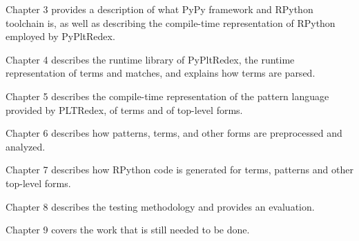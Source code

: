 Chapter 3 provides a description of what PyPy framework and RPython toolchain is, as well as describing the compile-time representation of RPython employed by PyPltRedex.

Chapter 4 describes the runtime library of PyPltRedex, the runtime representation of terms and matches, and explains how terms are parsed.

Chapter 5 describes the compile-time representation of the pattern language provided by PLTRedex, of terms and of top-level forms.

Chapter 6 describes how patterns, terms, and other forms are preprocessed and analyzed.

Chapter 7 describes how RPython code is generated for terms, patterns and other top-level forms.

Chapter 8 describes the testing methodology and provides an evaluation. 

Chapter 9 covers the work that is still needed to be done.
